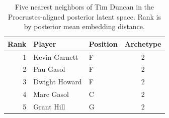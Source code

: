 \begin{table}[htbp]
  \centering\small
  \begin{tabular}{rllc}
    \toprule
    Rank & Player & Position & Archetype \\
    \midrule
    1 & Kevin Garnett & F & 2 \\
    2 & Pau Gasol & F & 2 \\
    3 & Dwight Howard & F & 2 \\
    4 & Marc Gasol & C & 2 \\
    5 & Grant Hill & G & 2 \\
    \bottomrule
  \end{tabular}
  \caption{Five nearest neighbors of Tim Duncan in the Procrustes-aligned posterior latent space. Rank is by posterior mean embedding distance.}
\end{table}

